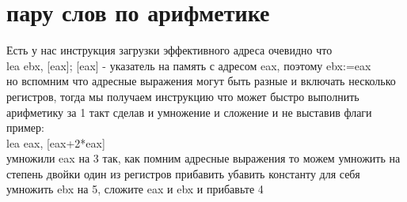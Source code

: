 \documentclass[a4paper,10pt]{article}
\begin{document}
\section*{пару слов по арифметике}
Есть у нас инструкция загрузки эффективного адреса очевидно что \\
lea ebx, [eax]; [eax] - указатель на память с адресом eax, поэтому ebx:=eax \\
но вспомним что адресные выражения могут быть разные и включать несколько регистров, тогда мы получаем инструкцию что может быстро выполнить арифметику за 1 такт сделав и умножение и сложение и не выставив флаги \\
пример: \\
lea eax, [eax+2*eax] \\ умножили eax на 3 так, как помним адресные выражения то можем умножить на степень двойки один из регистров прибавить убавить константу
для себя умножить ebx на 5, сложите eax и ebx и прибавьте 4\\
\end{document}
